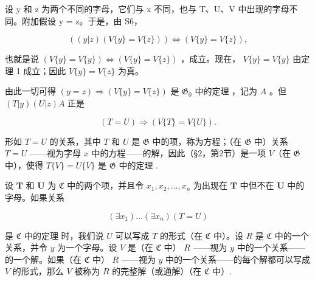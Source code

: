 设 y 和 z 为两个不同的字母，它们与 x 不同，也与 T、U、V 中出现的字母不同。附加假设 y = z。于是，由 S6，

\[
((y | z) (V \{y \} = V \{z \})) \Longleftrightarrow (V \{y \} = V \{z \}),
\]

也就是说 \((V\{y\} = V\{y\}) \Longleftrightarrow (V\{y\} = V\{z\})\) ，成立。现在， \(V\{y\} = V\{y\}\) 由定理 1 成立；因此 \(V\{y\} = V\{z\}\) 为真。

由此一切可得 \((y = z) \Longrightarrow (V\{y\} = V\{z\})\) 是 \(\mathfrak{G}_0\) 中的定理 ，记为 \(A\) 。但 \((T|y)(U|z)A\) 正是

\[
(T = U) \Longrightarrow (V \{T \} = V \{U \}).
\]

形如 \(T = U\) 的关系，其中 \(T\) 和 \(U\) 是 \(\mathfrak{G}\) 中的项，称为方程；（在 \(\mathfrak{G}\) 中）关系 \(T = U\) ——视为字母 \(x\) 中的方程——的解，因此（§2，第2节）是一项 \(V\)（在 \(\mathfrak{G}\) 中），使得 \(T\{V\} = U\{V\}\) 是 \(\mathfrak{G}\) 中的定理 .

设 \(\pmb{T}\) 和 \(\pmb{U}\) 为 \(\mathfrak{C}\) 中的两个项，并且令 \(x_1, x_2, \ldots, x_n\) 为出现在 \(\pmb{T}\) 中但不在 \(\pmb{U}\) 中的字母。如果关系

\[
(\exists x _ {1}) \dots (\exists x _ {n}) (T = U)
\]

是 \(\mathfrak{C}\) 中的定理 时，我们说 \(U\) 可以写成 \(T\) 的形式（在 \(\mathfrak{C}\) 中）。设 \(R\) 是 \(\mathfrak{C}\) 中的一个关系，并令 \(y\) 为一个字母。设 \(V\) 是（在 \(\mathfrak{C}\) 中） \(R\) ——视为 \(y\) 中的一个关系——的一个解。如果（在 \(\mathfrak{C}\) 中） \(R\) ——视为 \(y\) 中的一个关系——的每个解都可以写成 \(V\) 的形式，那么 \(V\) 被称为 \(R\) 的完整解（或通解）（在 \(\mathfrak{C}\) 中）.

